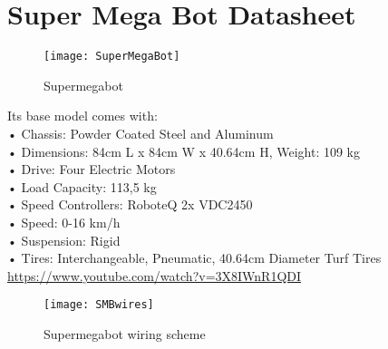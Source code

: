 
\section{Super Mega Bot Datasheet}
\label{AppA}

\begin{figure}[h]
	\begin{center} 
		\texttt{[image: SuperMegaBot]}
		\caption{Supermegabot}
		\centering
		\label{fig:SuperMegaBot} 
	\end{center}
\end{figure}
Its base model comes with:\\
•	Chassis: Powder Coated Steel and Aluminum \\
•	Dimensions: 84cm L x 84cm W x 40.64cm H, Weight: 109 kg\\
•	Drive: Four Electric Motors\\
•	Load Capacity: 113,5 kg\\
•	Speed Controllers: RoboteQ 2x VDC2450\\
•	Speed: 0-16 km/h \\
•	Suspension: Rigid\\
•	Tires: Interchangeable, Pneumatic, 40.64cm Diameter Turf Tires\\
\url{https://www.youtube.com/watch?v=3X8IWnR1QDI}
\begin{figure}[h]
	\begin{center} 
		\texttt{[image: SMBwires]}
		\centering
		\caption{Supermegabot wiring scheme}
		\label{SMB Wiring} 
	\end{center}
\end{figure}